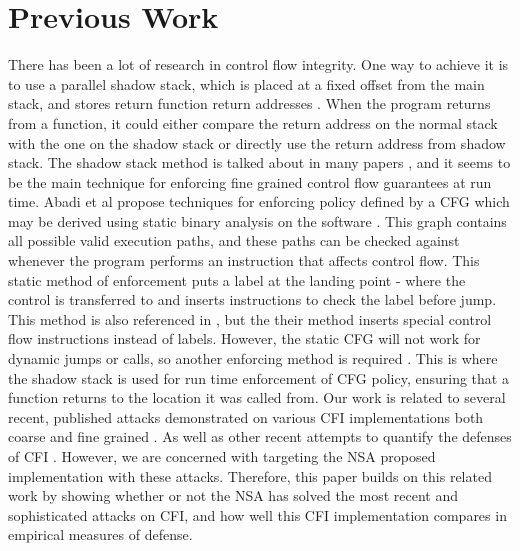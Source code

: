\documentclass[letterpaper,10pt]{article}
\begin{document}
\section{Previous Work}
\indent There has been a lot of research in control flow integrity. One way to achieve it is to use a parallel shadow stack, which is placed at a fixed offset from the main stack, and stores return function return addresses \cite{dang}. When the program returns from a function, it could either compare the return address on the normal stack with the one on the shadow stack or directly use the return address from shadow stack. The shadow stack method is talked about in many papers \cite{abadi, dang, evans, conti, carlini, schwartz}, and it seems to be the main technique for enforcing fine grained control flow guarantees at run time. Abadi et al propose techniques for enforcing policy defined by a CFG which may be derived using static binary analysis on the software \cite{abadi}. This graph contains all possible valid execution paths, and these paths can be checked against whenever the program performs an instruction that affects control flow. This static method of enforcement puts a label at the landing point - where the control is transferred to and inserts instructions to check the label before jump. This method is also referenced in \cite{NSAGitHub}, but the their method inserts special control flow instructions instead of labels. However, the static CFG will not work for dynamic jumps or calls, so another enforcing method is required \cite{abadi}. This is where the shadow stack is used for run time enforcement of CFG policy, ensuring that a function returns to the location it was called from.
\newline
\indent Our work is related to several recent, published attacks demonstrated on various CFI implementations both coarse and fine grained \cite{goktas, carlini, conti, Davi:2014}. As well as other recent attempts to quantify the defenses of CFI \cite{Zhang:2013:COTS}. However, we are concerned with targeting the NSA proposed implementation with these attacks. Therefore, this paper builds on this related work by showing whether or not the NSA has solved the most recent and sophisticated attacks on CFI, and how well this CFI implementation compares in empirical measures of defense.
\newline
\end{document}
